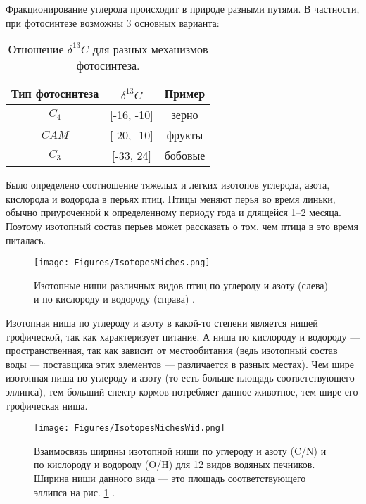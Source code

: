 \documentclass[a5paper,openany]{book}
\begin{document}
Фракционирование углерода происходит в природе разными путями. В частности, при фотосинтезе возможны 3 основных варианта: 
\begin{table}[h!]
	\centering
	\caption{Отношение $\delta^{13}C$ для разных механизмов фотосинтеза.} 
	\medskip 
	\begin{tabular}{|c|c|c|}
		\hline
		Тип фотосинтеза & $\delta^{13}C$ & Пример \\
		\hline 
		$C_4$ & [-16, -10] & зерно \\
		$CAM$ & [-20, -10] & фрукты\\
		$C_3$ & [-33, 24] & бобовые \\			
		\hline
	\end{tabular}
	\label{13Cplants}
\end{table} 

Было определено соотношение тяжелых и легких изотопов углерода, азота, кислорода и водорода в  перьях птиц. Птицы меняют перья во время линьки, обычно приуроченной к определенному периоду года и длящейся 1–2 месяца. Поэтому изотопный состав перьев может рассказать о том, чем птица в это время питалась. 
\begin{figure}[ht] 
	\centering\small
	\unitlength=1mm
	{\texttt{[image: Figures/IsotopesNiches.png]}} 
	\caption{Изотопные ниши различных видов птиц по углероду и азоту (слева) и по кислороду и водороду (справа) \cite{Rader2017}.} 
	\label{f:IsotopesNiches}
\end{figure}


Изотопная ниша по углероду и азоту в какой-то степени является нишей трофической, так как характеризует питание. А ниша по кислороду и водороду — пространственная, так как зависит от местообитания (ведь изотопный состав воды — поставщика этих элементов — различается в разных местах). Чем шире изотопная ниша по углероду и азоту (то есть больше площадь соответствующего эллипса), тем больший спектр кормов потребляет данное животное, тем шире его трофическая ниша. 

\begin{figure}[ht] 
	\centering\small
	\unitlength=1mm
	{\texttt{[image: Figures/IsotopesNichesWid.png]}} 
	\caption{Взаимосвязь ширины изотопной ниши по углероду и азоту (C/N) и по кислороду и водороду (O/H) для 12 видов водяных печников. Ширина ниши данного вида — это площадь соответствующего эллипса на рис. \ref{f:IsotopesNiches} \cite{Rader2017}.} 
	\label{f:IsotopesNichesWid}
\end{figure}
\end{document}
